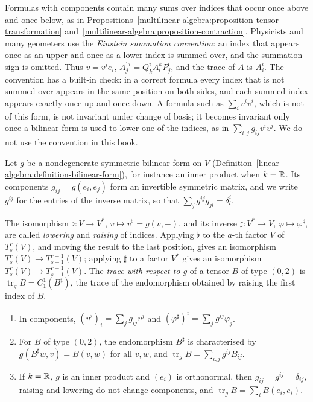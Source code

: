 \begin{remark}\label{multilinear-algebra:remark-einstein-convention}
Formulas with components contain many sums over indices that occur once above and once below, as in Propositions~\ref{multilinear-algebra:proposition-tensor-transformation}
and~\ref{multilinear-algebra:proposition-contraction}. Physicists and many geometers use the \emph{Einstein summation convention}: an index that appears once as an upper and once as a lower index is
summed over, and the summation sign is omitted. Thus $v = v^ie_i$, $A^{\prime\,i}_j = Q^i_kA^k_lP^l_j$, and the trace of $A$ is $A^i_i$. The convention has a built-in check: in a correct formula
every index that is not summed over appears in the same position on both sides, and each summed index appears exactly once up and once down. A formula such as $\sum_iv^iv^i$, which is not of this
form, is not invariant under change of basis; it becomes invariant only once a bilinear form is used to lower one of the indices, as in $\sum_{i,j}g_{ij}v^iv^j$. We do not use the convention in this book.
\end{remark}

Let $g$ be a nondegenerate symmetric bilinear form on $V$ (Definition~\ref{linear-algebra:definition-bilinear-form}), for instance an inner product when $k = \mathbb{R}$. Its components
$g_{ij} = g(e_i, e_j)$ form an invertible symmetric matrix, and we write $g^{ij}$ for the entries of the inverse matrix, so that $\sum_jg^{ij}g_{jl} = \delta^i_l$.

\begin{definition}\label{multilinear-algebra:definition-raising-lowering}
The isomorphism $\flat \colon V \to V^*$, $v \mapsto v^\flat = g(v, -)$, and its inverse $\sharp \colon V^* \to V$, $\varphi \mapsto \varphi^\sharp$, are called \emph{lowering} and \emph{raising}
of indices. Applying $\flat$ to the $a$-th factor $V$ of $T^r_s(V)$, and moving the result to the last position, gives an isomorphism $T^r_s(V) \to T^{r-1}_{s+1}(V)$; applying $\sharp$ to a factor
$V^*$ gives an isomorphism $T^r_s(V) \to T^{r+1}_{s-1}(V)$. The \emph{trace with respect to $g$} of a tensor $B$ of type $(0,2)$ is
$\operatorname{tr}_gB = C^1_1(B^\sharp)$, the trace of the endomorphism obtained by raising the first index of $B$.
\end{definition}

\begin{proposition}\label{multilinear-algebra:proposition-raising-lowering}
\begin{enumerate}
\item In components, $(v^\flat)_i = \sum_jg_{ij}v^j$ and $(\varphi^\sharp)^i = \sum_jg^{ij}\varphi_j$.
\item For $B$ of type $(0,2)$, the endomorphism $B^\sharp$ is characterised by $g(B^\sharp w, v) = B(v, w)$ for all $v, w$, and $\operatorname{tr}_gB = \sum_{i,j}g^{ij}B_{ij}$.
\item If $k = \mathbb{R}$, $g$ is an inner product and $(e_i)$ is orthonormal, then $g_{ij} = g^{ij} = \delta_{ij}$, raising and lowering do not change components, and
$\operatorname{tr}_gB = \sum_iB(e_i, e_i)$.
\end{enumerate}
\end{proposition}

